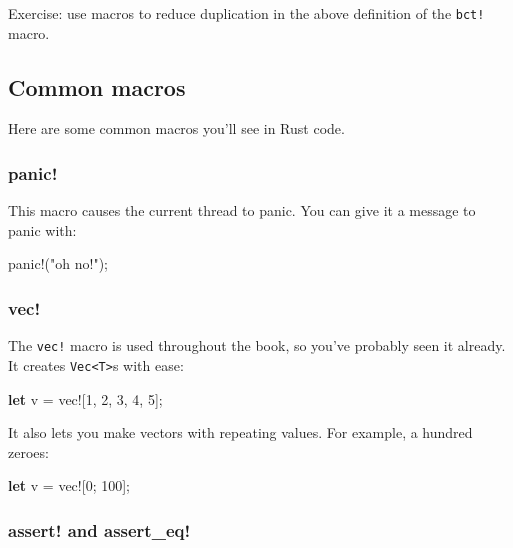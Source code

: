 \documentclass[a4paper,]{book}
\newenvironment{Shaded}{\begin{snugshade}}{\end{snugshade}}
\newcommand{\KeywordTok}[1]{\textcolor[rgb]{0.13,0.29,0.53}{\textbf{{#1}}}}
\newcommand{\DecValTok}[1]{\textcolor[rgb]{0.00,0.00,0.81}{{#1}}}
\newcommand{\StringTok}[1]{\textcolor[rgb]{0.31,0.60,0.02}{{#1}}}
\newcommand{\OtherTok}[1]{\textcolor[rgb]{0.56,0.35,0.01}{{#1}}}
\newcommand{\NormalTok}[1]{{#1}}
\begin{document}
Exercise: use macros to reduce duplication in the above definition of
the \texttt{bct!} macro.

\subsection{Common macros}\label{common-macros}

Here are some common macros you'll see in Rust code.

\subsubsection{panic!}\label{panic}

This macro causes the current thread to panic. You can give it a message
to panic with:

\begin{Shaded}
\begin{Highlighting}[]
\OtherTok{panic!}\NormalTok{(}\StringTok{"oh no!"}\NormalTok{);}
\end{Highlighting}
\end{Shaded}

\subsubsection{vec!}\label{vec}

The \texttt{vec!} macro is used throughout the book, so you've probably
seen it already. It creates \texttt{Vec\textless{}T\textgreater{}}s with
ease:

\begin{Shaded}
\begin{Highlighting}[]
\KeywordTok{let} \NormalTok{v = }\OtherTok{vec!}\NormalTok{[}\DecValTok{1}\NormalTok{, }\DecValTok{2}\NormalTok{, }\DecValTok{3}\NormalTok{, }\DecValTok{4}\NormalTok{, }\DecValTok{5}\NormalTok{];}
\end{Highlighting}
\end{Shaded}

It also lets you make vectors with repeating values. For example, a
hundred zeroes:

\begin{Shaded}
\begin{Highlighting}[]
\KeywordTok{let} \NormalTok{v = }\OtherTok{vec!}\NormalTok{[}\DecValTok{0}\NormalTok{; }\DecValTok{100}\NormalTok{];}
\end{Highlighting}
\end{Shaded}

\subsubsection{assert! and assert\_eq!}\label{assert-and-assertux5feq}
\end{document}
